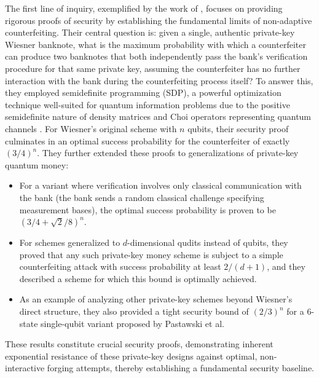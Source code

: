 \documentclass{article} %
\begin{document}
The first line of inquiry, exemplified by the work of \citet{Molina2012Optimal}, focuses on providing rigorous proofs of security by establishing the fundamental limits of non-adaptive counterfeiting. Their central question is: given a single, authentic private-key Wiesner banknote, what is the maximum probability with which a counterfeiter can produce two banknotes that both independently pass the bank's verification procedure for that same private key, assuming the counterfeiter has no further interaction with the bank during the counterfeiting process itself? To answer this, they employed semidefinite programming (SDP), a powerful optimization technique well-suited for quantum information problems due to the positive semidefinite nature of density matrices and Choi operators representing quantum channels \citep{NielsenChuang2010Quantum}. For Wiesner's original scheme with $n$ qubits, their security proof culminates in an optimal success probability for the counterfeiter of exactly $(3/4)^n$. They further extended these proofs to generalizations of private-key quantum money:
\begin{itemize}
    \item For a variant where verification involves only classical communication with the bank (the bank sends a random classical challenge specifying measurement bases), the optimal success probability is proven to be $(3/4 + \sqrt{2}/8)^n$.
    \item For schemes generalized to $d$-dimensional qudits instead of qubits, they proved that any such private-key money scheme is subject to a simple counterfeiting attack with success probability at least $2/(d+1)$, and they described a scheme for which this bound is optimally achieved.
    \item As an example of analyzing other private-key schemes beyond Wiesner's direct structure, they also provided a tight security bound of $(2/3)^n$ for a 6-state single-qubit variant proposed by Pastawski et al.
\end{itemize}
These results constitute crucial security proofs, demonstrating inherent exponential resistance of these private-key designs against optimal, non-interactive forging attempts, thereby establishing a fundamental security baseline.
\end{document}
